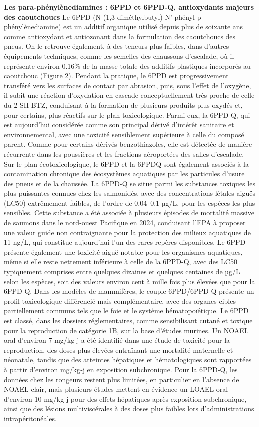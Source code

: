 \documentclass[pdflatex,sn-basic]{sn-jnl}%
\begin{document}
\textbf{Les para-phénylènediamines : 6PPD et 6PPD-Q, antioxydants majeurs des caoutchoucs}
Le 6PPD (N-(1,3-diméthylbutyl)-N'-phényl-p-phénylènediamine) est un additif organique utilisé depuis plus de soixante ans comme antioxydant et antiozonant dans la formulation des caoutchoucs des pneus. On le retrouve également, à des teneurs plus faibles, dans d'autres équipements techniques, comme les semelles des chaussons d'escalade, où il représente environ 0.16\% de la masse totale des additifs plastiques incorporés au caoutchouc (Figure 2). Pendant la pratique, le 6PPD est progressivement transféré vers les surfaces de contact par abrasion, puis, sous l'effet de l'oxygène, il subit une réaction d'oxydation en cascade conceptuellement très proche de celle du 2-SH-BTZ, conduisant à la formation de plusieurs produits plus oxydés et, pour certains, plus réactifs sur le plan toxicologique. Parmi eux, la 6PPD-Q, qui est aujourd'hui considérée comme son principal dérivé d'intérêt sanitaire et environnemental, avec une toxicité sensiblement supérieure à celle du composé parent. Comme
pour certains dérivés benzothiazoles, elle est détectée de manière récurrente dans les poussières et les fractions aéroportées des salles d'escalade. Sur le plan écotoxicologique, le 6PPD et la 6PPDQ sont également associés à la contamination chronique des écosystèmes aquatiques par les particules d'usure des pneus et de la chaussée.
La 6PPD-Q se situe parmi les substances toxiques les plus puissantes connues chez les salmonidés, avec des concentrations létales aiguës (LC50) extrêmement faibles, de l'ordre de 0,04–0,1 µg/L, pour les espèces les plus sensibles. Cette substance a été associée à plusieurs
épisodes de mortalité massive de saumons dans le nord-ouest Pacifique en 2024, conduisant l'EPA à proposer une valeur guide non contraignante pour la protection des milieux aquatiques de 11 ng/L, qui constitue aujourd'hui l'un des rares repères disponibles. Le 6PPD présente également une toxicité aiguë notable pour les organismes aquatiques, même si elle reste nettement inférieure à celle de la 6PPD-Q, avec des LC50 typiquement comprises entre quelques dizaines et quelques centaines de µg/L selon les espèces, soit des valeurs environ cent à mille fois plus élevées que pour la 6PPD-Q. Dans les modèles de mammifères, le couple 6PPD/6PPD‑Q présente un profil toxicologique
différencié mais complémentaire, avec des organes cibles partiellement communs tels que le foie et le système hématopoïétique. Le 6PPD est classé, dans les dossiers réglementaires, comme sensibilisant cutané et toxique pour la reproduction de catégorie 1B, sur la base d'études murines. Un NOAEL oral d'environ 7 mg/kg‑j a été identifié dans une étude de toxicité pour la reproduction, des doses plus élevées entraînant une mortalité maternelle et néonatale, tandis que des atteintes hépatiques et hématologiques sont rapportées à partir d'environ mg/kg‑j en exposition subchronique. Pour la 6PPD‑Q, les données chez les rongeurs restent plus limitées, en particulier en l'absence de NOAEL clair, mais plusieurs études mettent en évidence un LOAEL oral d'environ 10 mg/kg‑j pour des effets hépatiques après exposition
subchronique, ainsi que des lésions multiviscérales à des doses plus faibles lors d'administrations intrapéritonéales.
\end{document}
